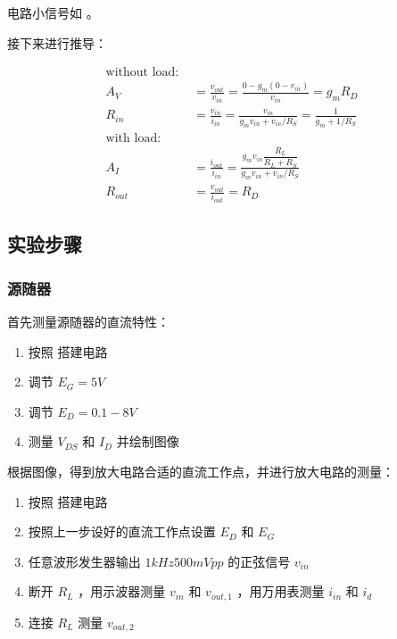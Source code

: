 \documentclass[lang=cn,11pt,a4paper,cite=authoryear]{elegantpaper}
\begin{document}
电路小信号如  。


接下来进行推导： 

\[\begin{aligned}
    \text{without load: } &\\
    A_V  &= \frac{v_{out}}{v_{in}} = \frac{0 - g_m(0 - v_{in})}{v_{in}} = g_m R_D \\ 
    R_{in} &= \frac{v_{in}}{i_{in}} = \frac{v_{in}}{g_m v_{in} + v_{in}/R_S} = \frac{1}{g_m + 1 / R_S} \\ 
    \text{with load: } &\\ 
    A_I &= \frac{i_{out}}{i_{in}} = \frac{g_m v_{in} \dfrac{R_L}{R_L + R_S}}{g_m v_{in} + v_{in} / R_S} \\ 
    R_{out} &= \frac{v_{out}}{i_{out}} = R_D
\end{aligned}\]

\subsection{实验步骤}

\subsubsection{源随器}

首先测量源随器的直流特性： 

\begin{enumerate}
    \item 按照  搭建电路
    \item 调节 \(E_G = 5 V\) 
    \item 调节 \(E_D = 0.1 - 8 V\) 
    \item 测量 \(V_{DS}\) 和 \(I_D\) 并绘制图像
\end{enumerate}


根据图像，得到放大电路合适的直流工作点，并进行放大电路的测量：

\begin{enumerate}
    \item 按照  搭建电路
    \item 按照上一步设好的直流工作点设置 \(E_D\) 和 \(E_G\) 
    \item 任意波形发生器输出 \(1 kHz 500 m Vpp\)  的正弦信号 \(v_{in}\) 
    \item 断开 \(R_L\) ，用示波器测量 \(v_{in}\) 和 \(v_{out,1}\) ，用万用表测量 \(i_{in}\) 和 \(i_d\) 
    \item 连接 \(R_L\) 测量 \(v_{out,2}\)
\end{enumerate}
\end{document}
